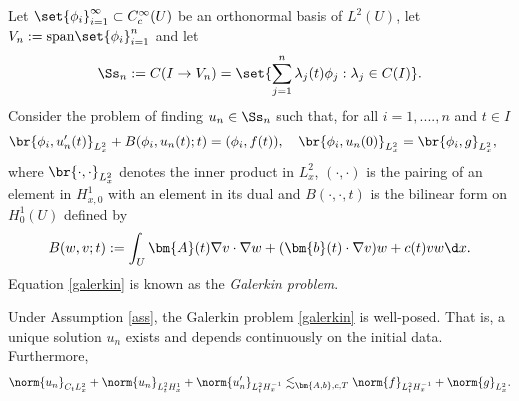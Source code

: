 \documentclass[
    a4paper,
    DIV=14,
    abstract=true,
    numbers=noenddot
]{scrartcl}
\begin{document}
Let $\set{\phi_i}_{i=1}^\infty\subset C^\infty_c(U)$ be an orthonormal basis of $L^2(U)$, let $V_n:= \text{span}\set{\phi_i}_{i=1}^n$ and let
\begin{align*}
  \Ss_n:= C(I \to V_n)= \set{\sum_{j=1}^n \lambda _j(t) \phi_j: \lambda_j \in C(I)}.
\end{align*}
Consider the problem of finding $u_n \in \Ss_n$ such that, for all $i=1,....,n$ and $t \in I$
\begin{align}\label{galerkin}
  \br{\phi_i, u'_n(t)}_{L^2_x} + B(\phi_i,u_n(t);t) & = (\phi _i, f(t)),\quad
 \br{\phi_i, u_n(0)}_{L^2_x}           = \br{\phi_i,g}_{L_x^2},
\end{align}
where $\br{\cdot ,\cdot }_{L^2_x}$ denotes the inner product in $L^2_x$, $(\cdot,\cdot)$ is the pairing of an element in $H^1_{x,0}$ with an element in its dual and $B(\cdot ,\cdot ,t)$ is the bilinear form on $H^1_0(U)$ defined by
\begin{align*}
 B(w,v; t) := \int_U \bm{A}(t) \nabla v \cdot \nabla w + (\bm{b}(t) \cdot \nabla v) w + c(t) v w \d x .
\end{align*}
Equation \eqref{galerkin} is known as the \emph{Galerkin problem}.
\begin{theorem}
 Under Assumption \ref{ass}, the Galerkin problem \eqref{galerkin} is well-posed. That is, a unique solution $u_n$ exists and depends continuously on the initial data. Furthermore,
  \begin{align}\label{bound}
    \norm{u_n}_{C_t L_x^2} +\norm{u_n}_{L^2_tH_{x}^1} + \norm{u_n'}_{L^2_tH_{x}^{-1}} \lesssim_{\bm{A,b},c,T} \norm{f}_{L^2_t H_x^{-1}}+ \norm{g}_{L_x^2}.
  \end{align}
\end{theorem}
\end{document}
